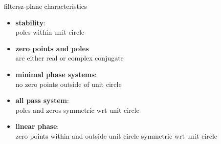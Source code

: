 		\begin{frame}{filters}{z-plane characteristics}
            \begin{itemize}
                \item   \textbf{stability}:\\ poles within unit circle
                \pause
                \smallskip
                \item   \textbf{zero points and poles}\\ are either real or complex conjugate
                \pause
                \smallskip
                \item   \textbf{minimal phase systems}:\\ no zero points outside of unit circle
                \pause
                \smallskip
                \item   \textbf{all pass system}:\\ poles and zeros symmetric wrt unit circle
                \pause
                \smallskip
                \item   \textbf{linear phase}:\\ zero points within and outside unit circle symmetric wrt unit circle
            \end{itemize}
 		\end{frame}
       

